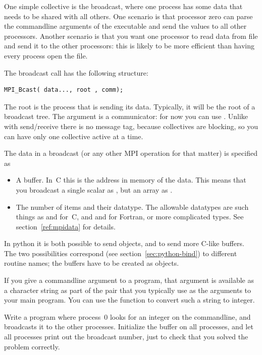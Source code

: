 One simple collective is the broadcast, where one process has some
data that needs to be shared with all others. One scenario is that
processor zero can parse the commandline arguments of the executable
and send the values to all other processors.
Another scenario is that you want one processor to read data from file
and send it to the other processors: this is likely to be more efficient
than having every process open the file.

The broadcast call has the following structure:
\begin{verbatim}
MPI_Bcast( data..., root , comm);
\end{verbatim}
The root is the process that is sending its data.
Typically, it will be the root of a broadcast tree.
The  argument is a communicator:
for now you can use .
Unlike with send/receive there is no message tag,
because collectives are blocking, so you can have only one collective active at a
time. 

The data in a broadcast (or any other MPI operation for that matter)
is specified as
\begin{itemize}
\item A buffer. In~C this is the address in memory of the data. This means
  that you broadcast a single scalar as ,
  but an array as .
\item The number of items and their datatype. The allowable datatypes
  are such things as  and  for~C, and
   and  for Fortran, or more complicated types.
  See section~\ref{ref:mpidata} for details.
\end{itemize}
\begin{pythonnote}
  In python it is both possible to send objects, and to send more
  C-like buffers. The two possibilities correspond (see
  section~\ref{sec:python-bind}) to different routine names; the
  buffers have to be created as  objects.
\end{pythonnote}

\begin{exercise}
  \label{ex:argv-bcast}
  If you give a commandline argument to a program, that argument is available
  as a character string as part of the  pair that you typically use
  as the arguments to your main program. You can use the function  to
  convert such a string to integer.

  Write a program where process~0 looks for an integer on the commandline, and
  broadcasts it to the other processes. Initialize the buffer on all processes, and
  let all processes print out the broadcast number,
  just to check that you solved the problem correctly.
\end{exercise}

